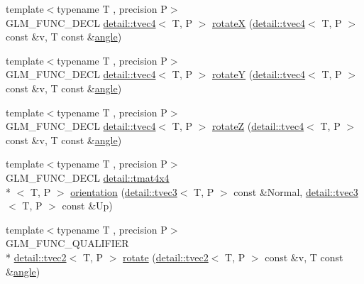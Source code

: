 \begin{DoxyCompactItemize}
\item 
{\footnotesize template$<$typename T , precision P$>$ }\\G\-L\-M\-\_\-\-F\-U\-N\-C\-\_\-\-D\-E\-C\-L \hyperlink{structglm_1_1detail_1_1tvec4}{detail\-::tvec4}$<$ T, P $>$ \hyperlink{group__gtx__rotate__vector_gaa0db2d8b73f86d7bfdf2bface4056e88}{rotate\-X} (\hyperlink{structglm_1_1detail_1_1tvec4}{detail\-::tvec4}$<$ T, P $>$ const \&v, T const \&\hyperlink{group__gtc__quaternion_ga23a3fc7ada5bbb665ff84c92c6e0542c}{angle})
\item 
{\footnotesize template$<$typename T , precision P$>$ }\\G\-L\-M\-\_\-\-F\-U\-N\-C\-\_\-\-D\-E\-C\-L \hyperlink{structglm_1_1detail_1_1tvec4}{detail\-::tvec4}$<$ T, P $>$ \hyperlink{group__gtx__rotate__vector_gae48a26ac0e3670ad2486858bf2a8e90b}{rotate\-Y} (\hyperlink{structglm_1_1detail_1_1tvec4}{detail\-::tvec4}$<$ T, P $>$ const \&v, T const \&\hyperlink{group__gtc__quaternion_ga23a3fc7ada5bbb665ff84c92c6e0542c}{angle})
\item 
{\footnotesize template$<$typename T , precision P$>$ }\\G\-L\-M\-\_\-\-F\-U\-N\-C\-\_\-\-D\-E\-C\-L \hyperlink{structglm_1_1detail_1_1tvec4}{detail\-::tvec4}$<$ T, P $>$ \hyperlink{group__gtx__rotate__vector_ga1db5137be16ed5d375038e06707ac52b}{rotate\-Z} (\hyperlink{structglm_1_1detail_1_1tvec4}{detail\-::tvec4}$<$ T, P $>$ const \&v, T const \&\hyperlink{group__gtc__quaternion_ga23a3fc7ada5bbb665ff84c92c6e0542c}{angle})
\item 
{\footnotesize template$<$typename T , precision P$>$ }\\G\-L\-M\-\_\-\-F\-U\-N\-C\-\_\-\-D\-E\-C\-L \hyperlink{structglm_1_1detail_1_1tmat4x4}{detail\-::tmat4x4}\\*
$<$ T, P $>$ \hyperlink{group__gtx__rotate__vector_gac80aaf3b2af70c7f03f1077d4b6ac507}{orientation} (\hyperlink{structglm_1_1detail_1_1tvec3}{detail\-::tvec3}$<$ T, P $>$ const \&Normal, \hyperlink{structglm_1_1detail_1_1tvec3}{detail\-::tvec3}$<$ T, P $>$ const \&Up)
\item 
{\footnotesize template$<$typename T , precision P$>$ }\\G\-L\-M\-\_\-\-F\-U\-N\-C\-\_\-\-Q\-U\-A\-L\-I\-F\-I\-E\-R \\*
\hyperlink{structglm_1_1detail_1_1tvec2}{detail\-::tvec2}$<$ T, P $>$ \hyperlink{group__gtx__rotate__vector_ga5520f6dd671807ec62a8f97c00c1b78b}{rotate} (\hyperlink{structglm_1_1detail_1_1tvec2}{detail\-::tvec2}$<$ T, P $>$ const \&v, T const \&\hyperlink{group__gtc__quaternion_ga23a3fc7ada5bbb665ff84c92c6e0542c}{angle})

\end{DoxyCompactItemize}
